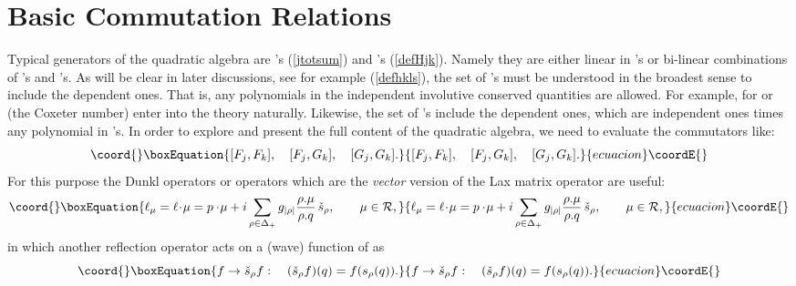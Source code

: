 \documentclass[a4paper,12pt]{article}
\begin{document}
\section{Basic Commutation Relations}
\label{basecomm}
\setcounter{equation}{0}

Typical generators of the quadratic algebra are \coordHE{}'s
(\ref{jtotsum}) and
\coordHE{}'s (\ref{defHjk}).  Namely they are either linear in
\coordHE{}'s or bi-linear combinations of \coordHE{}'s and \coordHE{}'s.
As will be clear in later discussions, see for example (\ref{defhkls}),
the set of \coordHE{}'s must be understood in the broadest sense to
include the dependent ones. That is, any polynomials in the independent
\coordHE{} involutive conserved quantities are allowed. For example, \coordHE{} for
\coordHE{} or  \coordHE{} (the Coxeter number) enter into
the theory naturally. Likewise, the set of \coordHE{}'s include
the dependent ones, which are independent ones times any
polynomial in \coordHE{}'s. In order to explore and present the
full content of the quadratic algebra, we need to evaluate the
commutators like:
\begin{equation}\coord{}\boxEquation{
[F_j,F_k],\quad [F_j,G_k],\quad [G_j,G_k].
\label{3coms}
}{
[F_j,F_k],\quad [F_j,G_k],\quad [G_j,G_k].
}{ecuacion}\coordE{}\end{equation}
For this purpose the Dunkl operators \cite{Dunk} or \myHighlight{$\ell$}\coordHE{} operators
which are the {\em vector} version of the Lax matrix operator \coordHE{}
\cite{kps} are useful:
\begin{equation}\coord{}\boxEquation{
  \ell_\mu=\ell\!\cdot\!\mu=p\cdot\!\mu +
  i\sum_{\rho\in\Delta_+}g_{|\rho|}
\frac{\rho.\mu}{\rho.q}\,\check{s}_\rho,
  \qquad \mu\in{\mathcal R},
\label{ldef}
}{
  \ell_\mu=\ell\!\cdot\!\mu=p\cdot\!\mu +
  i\sum_{\rho\in\Delta_+}g_{|\rho|}
\frac{\rho.\mu}{\rho.q}\,\check{s}_\rho,
  \qquad \mu\in{\mathcal R},
}{ecuacion}\coordE{}\end{equation}
in which another reflection operator \coordHE{} acts on a (wave)
function \coordHE{} of \coordHE{} as
\begin{equation}\coord{}\boxEquation{
f\to \check{s}_{\rho}f: \quad  (\check{s}_{\rho}f)(q)=f(s_{\rho}(q)).
\label{scdef}
}{
f\to \check{s}_{\rho}f: \quad  (\check{s}_{\rho}f)(q)=f(s_{\rho}(q)).
}{ecuacion}\coordE{}\end{equation}
\end{document}
